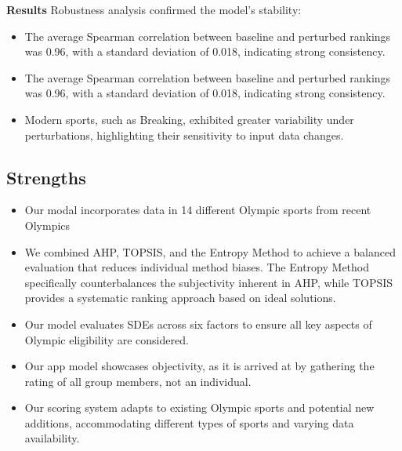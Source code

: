 \documentclass[12pt]{article}
\begin{document}
\textbf{Results}
Robustness analysis confirmed the model’s stability:
\begin{itemize}
    \item The average Spearman correlation between baseline and perturbed rankings was 0.96, with a standard deviation of 0.018, indicating strong consistency.
    \item The average Spearman correlation between baseline and perturbed rankings was 0.96, with a standard deviation of 0.018, indicating strong consistency.
    \item Modern sports, such as Breaking, exhibited greater variability under perturbations, highlighting their sensitivity to input data changes.

\end{itemize}

\subsection{Strengths} 
\begin{itemize}
    \item Our modal incorporates data in 14 different Olympic sports from recent Olympics
    
    \item We combined AHP, TOPSIS, and the Entropy Method to achieve a balanced evaluation that reduces individual method biases. The Entropy Method specifically counterbalances the subjectivity inherent in AHP, while TOPSIS provides a systematic ranking approach based on ideal solutions.

    \item Our model evaluates SDEs across six factors to ensure all key aspects of Olympic eligibility are considered.

    \item Our app model showcases objectivity, as it is arrived at by gathering the rating of all group members, not an individual.

    \item Our scoring system adapts to existing Olympic sports and potential new additions, accommodating different types of sports and varying data availability.

\end{itemize}
\end{document}
